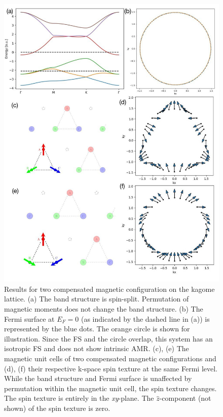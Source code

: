\documentclass[prb,showpacs,amsmath,amssymb,superscriptaddress,twocolumn,floatfix]{revtex4-1}
\begin{document}
\begin{figure}
	\centering
	\includegraphics[width=1\linewidth]{img/overview_Kagome_phase1a}
	\caption{Results for two compensated magnetic configuration on the kagome lattice. (a) The band structure is spin-split. Permutation of magnetic moments does not change the band structure. (b) The Fermi surface at $E_F = 0$ (as indicated by the dashed line in (a)) is represented by the blue dots. The orange circle is shown for illustration. Since the FS and the circle overlap, this system has an isotropic FS and does not show intrinsic AMR. (c), (e) The magnetic unit cells of two compensated magnetic configurations and (d), (f) their respective k-space spin texture at the same Fermi level. While the band structure and Fermi surface is unaffected by permutation within the magnetic unit cell, the spin texture changes. The spin texture is entirely in the \textit{xy}-plane. The $\hat{z}$-component (not shown) of the spin texture is zero.}
	\label{fig:totalkagomephase1a}
\end{figure}
\end{document}
